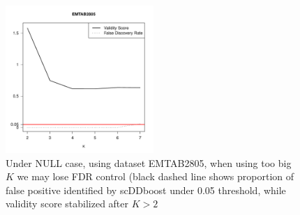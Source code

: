 \documentclass[aoas,preprint]{imsart}
\begin{document}
\begin{figure}[h]
\includegraphics[width = 0.5\textwidth]{Figs/breakFDR.pdf}
 \caption{Under NULL case, using dataset EMTAB2805, when using too big $K$ we may lose FDR control (black dashed line shows proportion of false positive identified by scDDboost under 0.05 threshold, while validity score stabilized after $K > 2$ }
  \label{fig:lfdr}
\end{figure}

\clearpage




\end{document}
